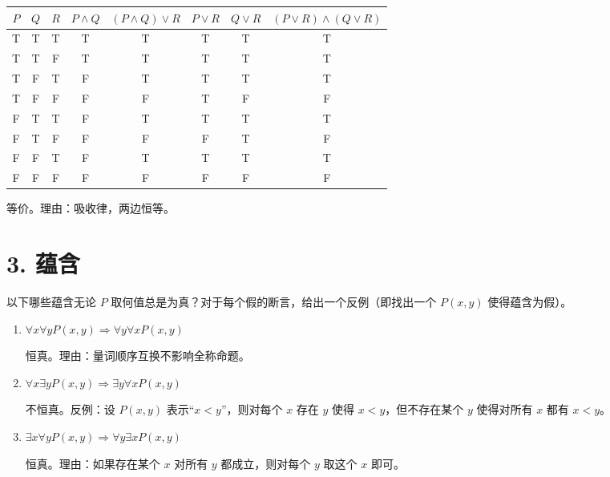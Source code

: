 \documentclass[11pt]{article}
\newenvironment{qparts}{\begin{enumerate}[{(}a{)}]}{\end{enumerate}}
\begin{document}
\begin{qparts}
\begin{center}
\begin{tabular}{|c|c|c|c|c|c|c|c|}
\hline
$P$ & $Q$ & $R$ & $P \wedge Q$ & $(P \wedge Q) \vee R$ & $P \vee R$ & $Q \vee R$ & $(P \vee R) \wedge (Q \vee R)$ \\
\hline
T & T & T & T & T & T & T & T \\
T & T & F & T & T & T & T & T \\
T & F & T & F & T & T & T & T \\
T & F & F & F & F & T & F & F \\
F & T & T & F & T & T & T & T \\
F & T & F & F & F & F & T & F \\
F & F & T & F & T & T & T & T \\
F & F & F & F & F & F & F & F \\
\hline
\end{tabular}
\end{center}

等价。理由：吸收律，两边恒等。

\end{qparts}

\section*{3. 蕴含}
以下哪些蕴含无论 $P$ 取何值总是为真？对于每个假的断言，给出一个反例（即找出一个 $P(x, y)$ 使得蕴含为假）。

\begin{qparts}
\item $\forall x \forall y P(x, y) \Longrightarrow \forall y \forall x P(x, y)$

恒真。理由：量词顺序互换不影响全称命题。

\item $\forall x \exists y P(x, y) \Longrightarrow \exists y \forall x P(x, y)$

不恒真。反例：设 $P(x, y)$ 表示“$x < y$”，则对每个 $x$ 存在 $y$ 使得 $x < y$，但不存在某个 $y$ 使得对所有 $x$ 都有 $x < y$。

\item $\exists x \forall y P(x, y) \Longrightarrow \forall y \exists x P(x, y)$

恒真。理由：如果存在某个 $x$ 对所有 $y$ 都成立，则对每个 $y$ 取这个 $x$ 即可。

\end{qparts}
\end{document}
